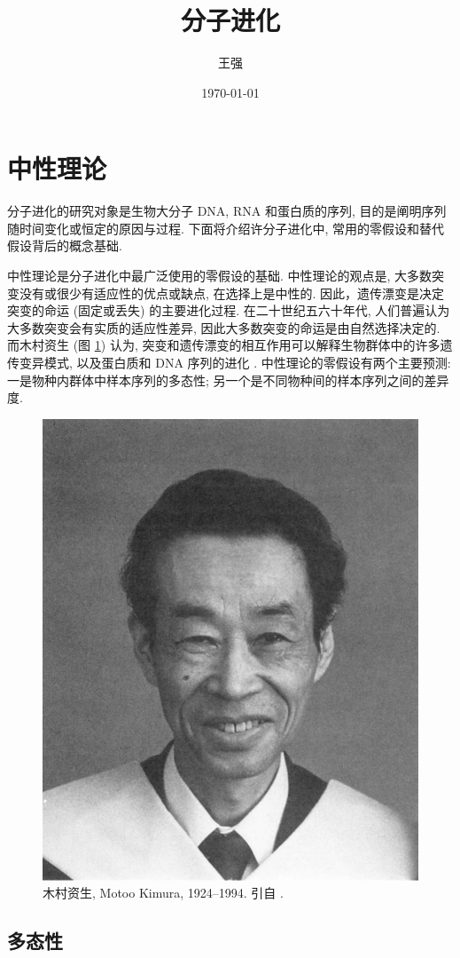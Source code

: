 \documentclass[12pt]{article}
\title{分子进化}
\author{王强}
\institute{南京大学生命科学学院}
\date{\today}
\begin{document}
\maketitle

{
    \setcounter{tocdepth}{3}
    \renewcommand\contentsname{目录}
    \tableofcontents
    \newpage
}

\section{中性理论}

分子进化的研究对象是生物大分子 DNA, RNA 和蛋白质的序列, 目的是阐明序列随时间变化或恒定的原因与过程.
下面将介绍许分子进化中, 常用的零假设和替代假设背后的概念基础.

中性理论是分子进化中最广泛使用的零假设的基础.
中性理论的观点是, 大多数突变没有或很少有适应性的优点或缺点, 在选择上是中性的.
因此，遗传漂变是决定突变的命运 (固定或丢失) 的主要进化过程.
在二十世纪五六十年代, 人们普遍认为大多数突变会有实质的适应性差异, 因此大多数突变的命运是由自然选择决定的.
而木村资生 (图 \ref{fig:1}) 认为, 突变和遗传漂变的相互作用可以解释生物群体中的许多遗传变异模式,
以及蛋白质和 DNA 序列的进化 \parencite{kimura1969, kimura1983}.
中性理论的零假设有两个主要预测:
一是物种内群体中样本序列的多态性; 另一个是不同物种间的样本序列之间的差异度.

\begin{figure}
    \center
    \includegraphics[width=0.5\linewidth]{basic-mol-evo.images/Kimura.jpg}
    \caption{木村资生, Motoo Kimura, 1924--1994. 引自 \textcite{crow1995}.}
    \label{fig:1}
\end{figure}

\subsection{多态性}
\end{document}
